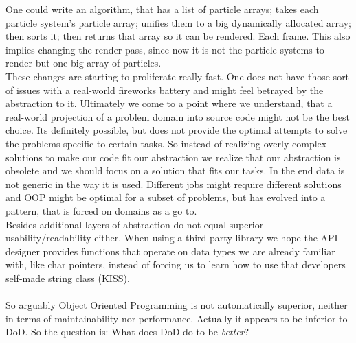 One could write an algorithm, that has a list of particle arrays; takes each particle system's particle array; unifies them to a big dynamically allocated array; then sorts it; then returns that array so it can be rendered. Each frame. This also implies changing the render pass, since now it is not the particle systems to render but one big array of particles.\\
These changes are starting to proliferate really fast. One does not have those sort of issues with a real-world fireworks battery and might feel betrayed by the abstraction to it. Ultimately we come to a point where we understand, that a real-world projection of a problem domain into source code might not be the best choice. Its definitely possible, but does not provide the optimal attempts to solve the problems specific to certain tasks. So instead of realizing overly complex solutions to make our code fit our abstraction we realize that our abstraction is obsolete and we should focus on a solution that fits our tasks. In the end data is not generic in the way it is used. Different jobs might require different solutions and OOP might be optimal for a subset of problems, but has evolved into a pattern, that is forced on domains as a go to.\\
Besides additional layers of abstraction do not equal superior usability/readability either. When using a third party library we hope the API designer provides functions that operate on data types we are already familiar with, like char pointers, instead of forcing us to learn how to use that developers self-made string class (KISS).\\\\
So arguably Object Oriented Programming is not automatically superior, neither in terms of maintainability nor performance. Actually it appears to be inferior to DoD. So the question is: What does DoD do to be \textit{better}?\newpage
